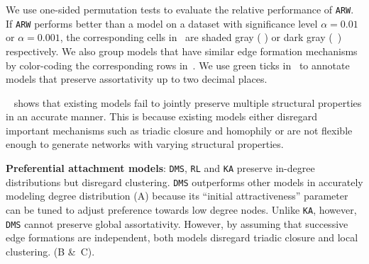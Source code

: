 We use one-sided permutation tests \cite{good2013permutation} to evaluate the relative
performance of \texttt{ARW}. If \texttt{ARW} performs better than a model on a dataset
with significance level $\alpha=0.01$ or $\alpha=0.001$, the corresponding cells in~
are shaded gray ( \lightgraybg{ }) or dark gray (~\darkgraybg{ }) respectively.
We also group models that have similar edge formation mechanisms by color-coding the
corresponding rows in~.  We use green ticks in~ to
annotate models that preserve assortativity up to two decimal places.


~ shows that existing models fail to jointly preserve
{multiple} structural properties in an accurate manner. This is because existing
models either disregard important mechanisms such as triadic closure and homophily
or are not flexible enough to generate networks with varying structural properties.

\textbf{Preferential attachment models}: \texttt{DMS}, \texttt{RL}
and \texttt{KA} preserve in-degree distributions but disregard
clustering. \texttt{DMS} outperforms other models in accurately modeling
degree distribution (A) because its ``initial attractiveness''
parameter can be tuned to adjust preference towards low degree nodes. Unlike \texttt{KA}, however,
\texttt{DMS} cannot preserve global assortativity.
However, by assuming that successive edge formations are independent, both models disregard
triadic closure and local clustering. (B \&~C).

